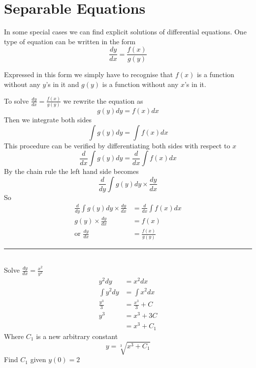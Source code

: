 \section{Separable Equations}
In some special cases we can find explicit solutions of differential equations. One type of equation can be written in the form
\begin{equation*}\frac{d y}{d x} =\frac{f (x)}{g (y)}
\end{equation*}

Expressed in this form we simply have to recognise that $f (x)$ is a function without any $y$'s in it and $g (y)$ is a function without any $x$'s in it. 

To solve $\frac{d y}{d x} =\frac{f (x)}{g (y)}$ we rewrite the equation as
\begin{equation*}g (y) d y =f (x) d x
\end{equation*}Then we integrate both sides
\begin{equation*}\int g (y) d y =\int f (x) d x
\end{equation*}This procedure can be verified by differentiating both sides with respect to $x$
\begin{equation*}\frac{d}{d x} \int g (y) d y =\frac{d}{d x} \int f (x) d x
\end{equation*}By the chain rule the left hand side becomes
\begin{equation*}\frac{d}{d y} \int g (y) d y \times \frac{d y}{d x}
\end{equation*}So
\begin{align*}\frac{d}{d y} \int g (y) d y \times \frac{d y}{d x} &    = \frac{d}{d x} \int f (x) d x \\
g (y) \times \frac{d y}{d x} &    = f (x) \\
\text{or\  \  \ }\frac{d y}{d x} &    = \frac{f (x)}{g (y)}\end{align*}
\rule{\textwidth}{0.5pt}\\
\example Solve $\displaystyle \frac{d y}{d x} =\frac{x^{2}}{y^{2}}$\medskip\\
\solution
\begin{align*}y^{2} d y &    = x^{2} d x \\
\int y^{2} d y &    = \int x^{2} d x \\
\frac{y^{3}}{3} &    = \frac{x^{3}}{3} +C \\
y^{3} &    = x^{3} +3 C \\
 &    = x^{3} +C_{1}\end{align*}Where $C_{1}$ is a new arbitrary constant
\begin{equation*}y =\sqrt[{3}]{x^{3} +C_{1}}
\end{equation*}Find $C_{1}$ given $y (0) =2$
